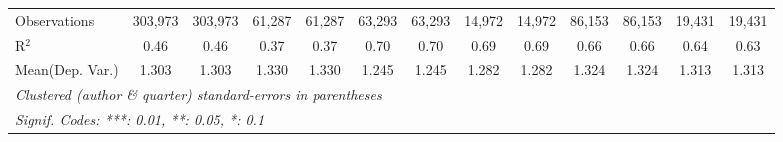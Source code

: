 \begin{tabular}{lcccccccccccc}
   Observations                             & 303,973       & 303,973       & 61,287        & 61,287  & 63,293      & 63,293        & 14,972  & 14,972        & 86,153  & 86,153  & 19,431       & 19,431\\  
   R$^2$                                    & 0.46          & 0.46          & 0.37          & 0.37    & 0.70        & 0.70          & 0.69    & 0.69          & 0.66    & 0.66    & 0.64         & 0.63\\  
Mean(Dep. Var.) & 1.303 & 1.303 & 1.330 & 1.330 & 1.245 & 1.245 & 1.282 & 1.282 & 1.324 & 1.324 & 1.313 & 1.313 \\
   \midrule \midrule
   \multicolumn{13}{l}{\emph{Clustered (author \& quarter) standard-errors in parentheses}}\\
   \multicolumn{13}{l}{\emph{Signif. Codes: ***: 0.01, **: 0.05, *: 0.1}}\\
\end{tabular}
\par\endgroup
